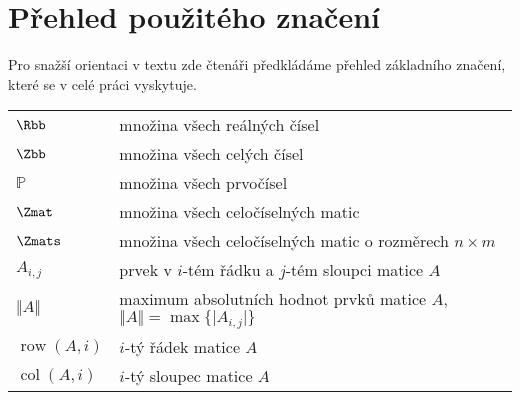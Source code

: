 \chapter*{Přehled použitého značení}

Pro snažší orientaci v textu zde čtenáři předkládáme přehled základního značení, které se v celé práci vyskytuje.
\begin{flushleft}
\begin{longtable}[l]{ll} %
  $\Rbb$                      & množina všech reálných čísel \\[1mm]
  $\Zbb$                      & množina všech celých čísel \\[1mm]
  $\mathbb{P}$                & množina všech prvočísel\\[1mm]
  $\Zmat$                     & množina všech celočíselných matic\\[1mm]
  $\Zmats$                    & množina všech celočíselných matic o rozměrech $ n \times m $\\[1mm]
  $A_{i, j}$			      & prvek v $ i $-tém řádku a $ j $-tém sloupci matice $ A $\\[1mm]
  $\Vert A \Vert$             & maximum absolutních hodnot prvků matice $ A $, $ \Vert A \Vert = \max{\{\vert A_{i, j} \vert \}}$\\[1mm]
  $\operatorname{row}(A, i) $ & $ i $-tý řádek matice $ A $\\[1mm]
  $\operatorname{col}(A, i) $ & $ i $-tý sloupec matice $ A $\\[1mm]

\end{longtable}
\end{flushleft}

\cleardoublepage
